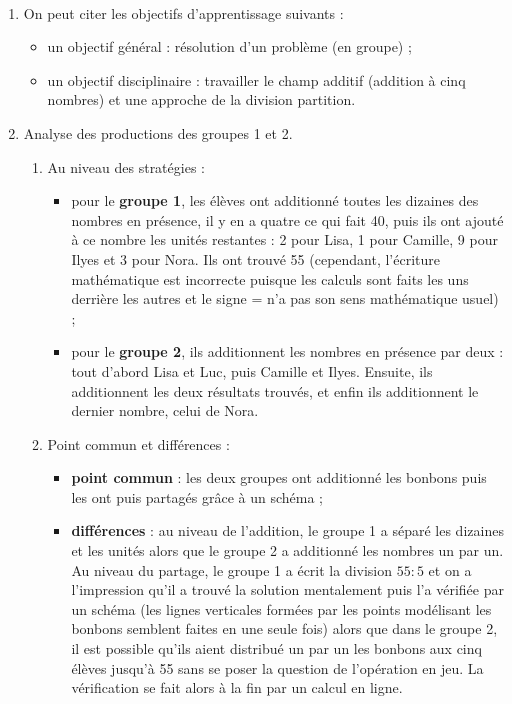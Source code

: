 \begin{corrige}
\ \\ [-5mm]
\begin{enumerate}
   \item On peut citer les objectifs d'apprentissage suivants :
   \begin{itemize}
      \item un objectif général : résolution d'un problème (en groupe) ;
      \item un objectif disciplinaire : travailler le champ additif (addition à cinq nombres) et une approche de la division partition.
   \end{itemize}
   \item Analyse des productions des groupes 1 et 2. \\
   \begin{enumerate}
      \item Au niveau des stratégies :
      \begin{itemize}
         \item pour le {\bf groupe 1}, les élèves ont additionné toutes les dizaines des nombres en présence, il y en a quatre ce qui fait 40, puis ils ont ajouté à ce nombre les unités restantes : 2 pour Lisa, 1 pour Camille, 9 pour Ilyes et 3 pour Nora. Ils ont trouvé 55 (cependant, l'écriture mathématique est incorrecte puisque les calculs sont faits les uns derrière les autres et le signe \og = \fg{} n'a pas son sens mathématique usuel) ;
         \item pour le {\bf groupe 2}, ils additionnent les nombres en présence par deux : tout d'abord Lisa et Luc, puis Camille et Ilyes. Ensuite, ils additionnent les deux résultats trouvés, et enfin ils additionnent le dernier nombre, celui de Nora.
      \end{itemize}
      \item Point commun et différences :
      \begin{itemize}
         \item {\bf point commun} : les deux groupes ont additionné les bonbons puis les ont puis \og partagés \fg{} grâce à un schéma ;
         \item {\bf différences} : au niveau de l'addition, le groupe 1 a séparé les dizaines et les unités alors que le groupe 2 a additionné les nombres un par un. \\
         Au niveau du partage, le groupe 1 a écrit la division $55:5$ et on a l'impression qu'il a trouvé la solution mentalement puis l'a vérifiée par un schéma (les lignes verticales formées par les points modélisant les bonbons semblent faites en une seule fois) alors que dans le groupe 2, il est possible qu'ils aient distribué un par un les bonbons aux cinq élèves jusqu'à 55 sans se poser la question de l'opération en jeu. La vérification se fait alors à la fin par un calcul en ligne.

\end{itemize}
\end{enumerate}
\end{enumerate}
\end{corrige}
